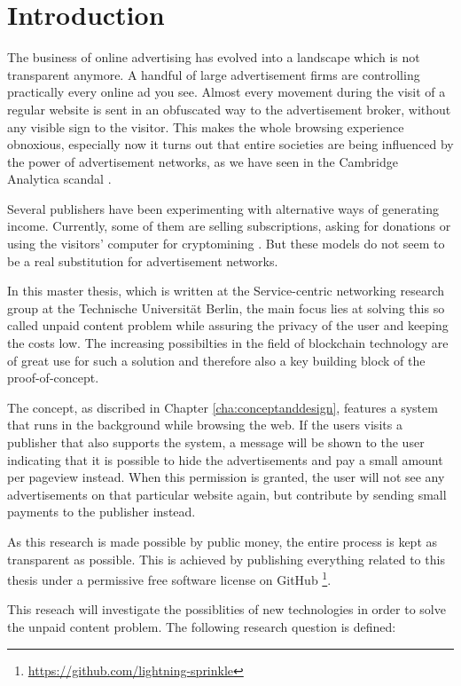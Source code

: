 \chapter{Introduction}
\label{cha:introduction}

The business of online advertising has evolved into a landscape which is not transparent anymore. A handful of large advertisement firms are controlling practically every online ad you see. Almost every movement during the visit of a regular website is sent in an obfuscated way to the advertisement broker, without any visible sign to the visitor. This makes the whole browsing experience obnoxious, especially now it turns out that entire societies are being influenced by the power of advertisement networks, as we have seen in the Cambridge Analytica scandal \cite{cadwalladr2018cambridge}.

Several publishers have been experimenting with alternative ways of generating income. Currently, some of them are selling subscriptions, asking for donations or using the visitors' computer for cryptomining \cite{ruth2018digging}. But these models do not seem to be a real substitution for advertisement networks. 

In this master thesis, which is written at the Service-centric networking research group at the Technische Universität Berlin, the main focus lies at solving this so called unpaid content problem while assuring the privacy of the user and keeping the costs low. The increasing possibilties in the field of blockchain technology are of great use for such a solution and therefore also a key building block of the proof-of-concept.

The concept, as discribed in Chapter \ref{cha:conceptanddesign}, features a system that runs in the background while browsing the web. If the users visits a publisher that also supports the system, a message will be shown to the user indicating that it is possible to hide the advertisements and pay a small amount per pageview instead. When this permission is granted, the user will not see any advertisements on that particular website again, but contribute by sending small payments to the publisher instead.

As this research is made possible by public money, the entire process is kept as transparent as possible. This is achieved by publishing everything related to this thesis under a permissive free software license on GitHub \footnote{\url{https://github.com/lightning-sprinkle}}.

This reseach will investigate the possiblities of new technologies in order to solve the unpaid content problem. The following research question is defined:
\vspace{1em}

